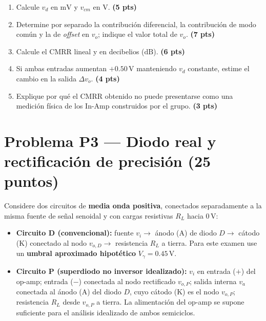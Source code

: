 \documentclass[10pt, a4paper]{article}
\begin{document}
\begin{enumerate}
    \renewcommand{\labelenumi}{(\alph{enumi})}
    \setlength{\itemsep}{2pt}
    \item Calcule $v_d$ en $\mathrm{mV}$ y $v_{cm}$ en $\mathrm{V}$. \hfill \textbf{(5 pts)}
    \item Determine por separado la contribución diferencial, la contribución de modo común y la de \textit{offset} en $v_o$; indique el valor total de $v_o$. \hfill \textbf{(7 pts)}
    \item Calcule el $\mathrm{CMRR}$ lineal y en decibelios ($\mathrm{dB}$). \hfill \textbf{(6 pts)}
    \item Si ambas entradas aumentan $+0.50\,\mathrm{V}$ manteniendo $v_d$ constante, estime el cambio en la salida $\Delta v_o$. \hfill \textbf{(4 pts)}
    \item Explique por qué el $\mathrm{CMRR}$ obtenido no puede presentarse como una medición física de los In-Amp construidos por el grupo. \hfill \textbf{(3 pts)}
\end{enumerate}

\section*{Problema P3 --- Diodo real y rectificación de precisión (25 puntos)}

Considere dos circuitos de \textbf{media onda positiva}, conectados separadamente a la misma fuente de señal senoidal y con cargas resistivas $R_L$ hacia $0\,\mathrm{V}$:

\begin{itemize}
    \setlength{\itemsep}{1pt}
    \item \textbf{Circuito D (convencional):} fuente $v_i \to$ ánodo (A) de diodo $D \to$ cátodo (K) conectado al nodo $v_{o,D} \to$ resistencia $R_L$ a tierra. Para este examen use un \textbf{umbral aproximado hipotético} $V_\gamma = 0.45\,\mathrm{V}$.
    \item \textbf{Circuito P (superdiodo no inversor idealizado):} $v_i$ en entrada ($+$) del op-amp; entrada ($-$) conectada al nodo rectificado $v_{o,P}$; salida interna $v_a$ conectada al ánodo (A) del diodo $D$, cuyo cátodo (K) es el nodo $v_{o,P}$; resistencia $R_L$ desde $v_{o,P}$ a tierra. La alimentación del op-amp se supone suficiente para el análisis idealizado de ambos semiciclos.
\end{itemize}
\end{document}
